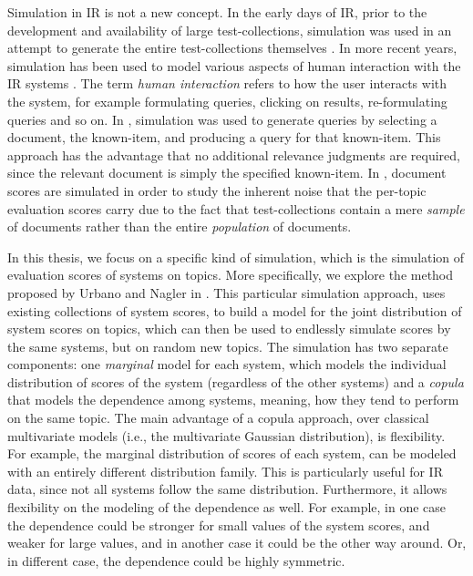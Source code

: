 Simulation in IR is not a new concept. In the early days of IR, prior to the development and availability of large test-collections, simulation was used in an attempt to generate the entire test-collections themselves \cite{Cooper1973, Tague1980}. In more recent years, simulation has been used to model various aspects of human interaction with the IR systems \cite{White2005, White2006, Azzopardi2011, Baskaya2013, Maxwell2016}. The term \textit{human interaction} refers to how the user interacts with the system, for example formulating queries, clicking on results, re-formulating queries and so on. In \cite{Azzopardi2007}, simulation was used to generate queries by selecting a document, the known-item, and producing a query for that known-item. This approach has the advantage that no additional relevance judgments are required, since the relevant document is simply the specified known-item. In \cite{Robertson2012}, document scores are simulated in order to study the inherent noise that the per-topic evaluation scores carry due to the fact that test-collections contain a mere \textit{sample} of documents rather than the entire \textit{population} of documents.

In this thesis, we focus on a specific kind of simulation, which is the simulation of evaluation scores of systems on topics. More specifically, we explore the method proposed by Urbano and Nagler in \cite{Urbano2018}. This particular simulation approach, uses existing collections of system scores, to build a model for the joint distribution of system scores on topics, which can then be used to endlessly simulate scores by the same systems, but on random new topics. The simulation has two separate components: one \textit{marginal} model for each system, which models the individual distribution of scores of the system (regardless of the other systems) and a \textit{copula} that models the dependence among systems, meaning, how they tend to perform on the same topic. The main advantage of a copula approach, over classical multivariate models (i.e., the multivariate Gaussian distribution), is flexibility. For example, the marginal distribution of scores of each system, can be modeled with an entirely different distribution family. This is particularly useful for IR data, since not all systems follow the same distribution. Furthermore, it allows flexibility on the modeling of the dependence as well. For example, in one case the dependence could be stronger for small values of the system scores, and weaker for large values, and in another case it could be the other way around. Or, in different case, the dependence could be highly symmetric. 

